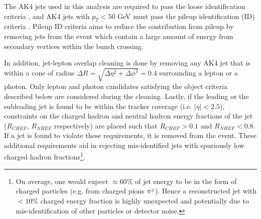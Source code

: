 The AK4 jets used in this analysis are required to pass the 
loose identification criteria \cite{CMS:JME_jetId}, and AK4 jets with $p_{T} < 50$ GeV 
must pass the pileup identification (ID) criteria \cite{CMS:JME_jetPuID}. 
Pileup ID criteria aims to reduce the contribution from
pileup by removing jets from the event which contain a large amount of energy from secondary vertices
within the bunch crossing.



In addition, jet-lepton overlap cleaning is done by removing any AK4 jet that is within a cone of radius
$\Delta R = \sqrt{\Delta \eta^2 + \Delta \phi^2} = 0.4$ surrounding a lepton or a photon. Only lepton and 
photon candidates satisfying the object criteria described below are considered during the cleaning.
Lastly, if the leading or the subleading jet is found to be within the tracker coverage (i.e. $|\eta| < 2.5$),
constraints on the charged hadron and neutral hadron energy fractions of the jet ($R_{CHEF}$, $R_{NHEF}$ respectively) 
are placed such that $R_{CHEF} > 0.1$ and 
$R_{NHEF} < 0.8$. If a jet is found to violate these requirements, it is removed from the event.
These additional requirements aid in rejecting mis-identified jets with spuriously low charged hadron 
fractions\footnote{On average, one would expect $\approx 60\%$ of jet energy to be in the form of charged particles
(e.g. from charged pions $\pi^{\pm}$). Hence a reconstructed jet with $<10 \%$ charged energy fraction is highly unexpected and potentially 
due to mis-identification of other particles or detector noise.}.

